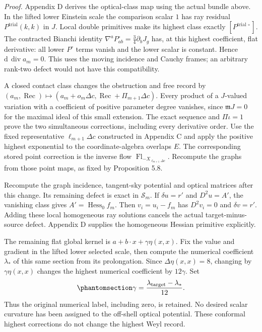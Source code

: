 \documentclass[
  english,
  11pt,
  reqno]{amsart}
\begin{document}
\emph{Proof.} Appendix D derives the optical-class map using the actual
bundle above. In the lifted lower Einstein scale the comparison scalar
\(1\) has ray residual \(P^{\mathrm{trial}}(k,k)\) in \(J\). Local
double primitives make its highest class exactly
\([P^{\mathrm{trial}\,\circ}]\). The contracted Bianchi identity
\(\nabla^aP^\circ_{ab}=\tfrac34\partial_bJ_g\) has, at this highest
coefficient, flat derivative: all lower \(P^\circ\) terms vanish and the
lower scalar is constant. Hence \(\mathrm d\,\operatorname{div}a_m=0\).
This uses the moving incidence and Cauchy frames; an arbitrary rank-two
defect would not have this compatibility.

A closed contact class changes the obstruction and free record by
\((a_m,\operatorname{Rec})\mapsto
(a_m+o_m\Delta c,\operatorname{Rec}+\Pi_{m+1}\Delta c)\). Every product
of a \(J\)-valued variation with a coefficient of positive parameter
degree vanishes, since \(\mathfrak mJ=0\) for the maximal ideal of this
small extension. The exact sequence and \(\Pi\iota=1\) prove the two
simultaneous corrections, including every derivative order. Use the
fixed representative \(\ell_{m+1}\Delta c\) constructed in Appendix C
and apply the positive highest exponential to the coordinate-algebra
overlaps \(E\). The corresponding stored point correction is the inverse
flow \(\operatorname{Fl}_{-X_{\ell_{m+1}\Delta c}}\). Recompute the
graphs from those point maps, as fixed by Proposition 5.8.

Recompute the graph incidence, tangent-sky potential and optical
matrices after this change. Its remaining defect is exact in
\(\mathcal S_m\). If \(\delta u=r'\) and \(D^2u=A'\), the vanishing
class gives \(A'=\operatorname{Hess}_0f_m\). Then \(v_i=u_i-f_m\) has
\(D^2v_i=0\) and \(\delta v=r'\). Adding these local homogeneous ray
solutions cancels the actual target-minus-source defect. Appendix D
supplies the homogeneous Hessian primitive explicitly.

The remaining flat global kernel is \(a+b\cdot x+\gamma\eta(x,x)\). Fix
the value and gradient in the lifted lower selected scale, then compute
the numerical coefficient \(\lambda_*\) of this same section from its
prolongation. Since \(\Delta\eta(x,x)=8\), changing by
\(\gamma\eta(x,x)\) changes the highest numerical coefficient by
\(12\gamma\). Set
\begin{equation}\protect\phantomsection\label{eq:gg-numerical-normalization}{
 \gamma=\frac{\lambda_{\mathrm{target}}-\lambda_*}{12}.
}\end{equation} Thus the original numerical label, including zero, is
retained. No desired scalar curvature has been assigned to the off-shell
optical potential. These conformal highest corrections do not change the
highest Weyl record.
\end{document}
